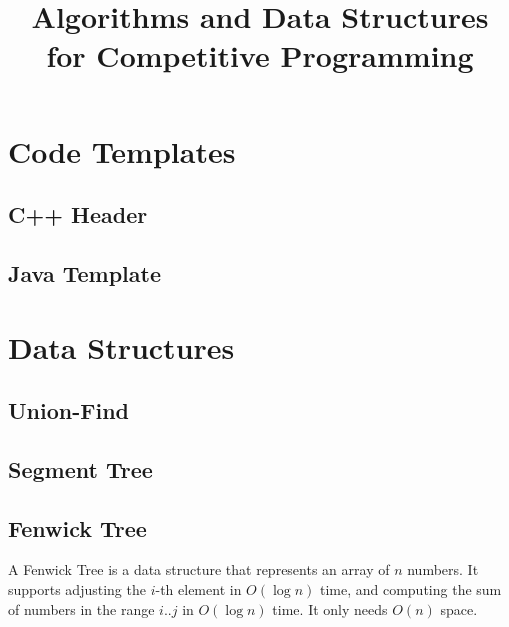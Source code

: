 \documentclass[10pt,a4paper,titlepage]{article}
\title{Algorithms and Data Structures for Competitive Programming}
\begin{document}
\maketitle
\tableofcontents
\newpage

\section{Code Templates}
\subsection{C++ Header}


\subsection{Java Template}


\section{Data Structures}

\subsection{Union-Find}



\subsection{Segment Tree}


\subsection{Fenwick Tree}
A Fenwick Tree is a data structure that represents an array of $n$ numbers. It supports adjusting the $i$-th element in $O(\log n)$ time, and computing the sum of numbers in the range $i..j$ in $O(\log n)$ time. It only needs $O(n)$ space.


\end{document}
